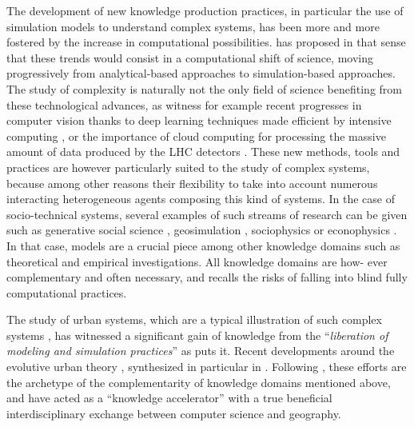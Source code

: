 The development of new knowledge production practices, in particular the use of simulation models to understand complex systems, has been more and more fostered by the increase in computational possibilities. \cite{arthur2015complexity} has proposed in that sense that these trends would consist in a computational shift of science, moving progressively from analytical-based approaches to simulation-based approaches. The study of complexity is naturally not the only field of science benefiting from these technological advances, as witness for example recent progresses in computer vision thanks to deep learning techniques made efficient by intensive computing \cite{lecun2015deep}, or the importance of cloud computing for processing the massive amount of data produced by the LHC detectors \cite{bird2011computing}. These new methods, tools and practices are however particularly suited to the study of complex systems, because among other reasons their flexibility to take into account numerous interacting heterogeneous agents composing this kind of systems. In the case of socio-technical systems, several examples of such streams of research can be given such as generative social science \cite{epstein2006generative}, geosimulation \cite{benenson2004geosimulation}, sociophysics \cite{galam2008sociophysics} or econophysics \cite{mantegna1999introduction}. In that case, models are a crucial piece among other knowledge domains \cite{raimbault2017applied} such as theoretical and empirical investigations. All knowledge domains are how- ever complementary and often necessary, and \cite{raimbault2016cautious} recalls the risks of falling into blind fully computational practices.

The study of urban systems, which are a typical illustration of such complex systems \cite{batty2007cities}, has witnessed a significant gain of knowledge from the ``\textit{liberation of modeling and simulation practices}'' as \cite{banos2013pour} puts it. Recent developments around the evolutive urban theory \cite{pumain1997pour}, synthesized in particular in \cite{pumain2017urban}. Following \cite{banos2017knowledge}, these efforts are the archetype of the complementarity of knowledge domains mentioned above, and have acted as a ``knowledge accelerator'' with a true beneficial interdisciplinary exchange between computer science and geography.

